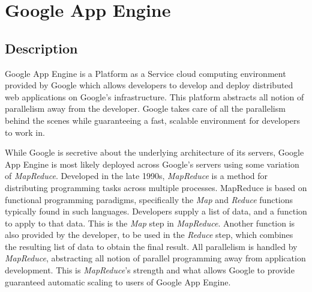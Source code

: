 \newcommand{\gae}[0]{Google App Engine}
\newcommand{\mr}[0]{\emph{MapReduce}}
\chapter{Google App Engine}

\section{Description}
\gae{} is a Platform as a Service cloud computing environment provided by Google which allows developers to develop and deploy distributed web applications on Google's infrastructure. This platform abstracts all notion of parallelism away from the developer. Google takes care of all the parallelism behind the scenes while guaranteeing a fast, scalable environment for developers to work in. 

While Google is secretive about the underlying architecture of its servers, \gae{} is most likely deployed across Google's servers using some variation of \mr{}. Developed in the late 1990s, \mr{} is a method for distributing programming tasks across multiple processes. MapReduce is based on functional programming paradigms, specifically the \emph{Map} and \emph{Reduce} functions typically found in such languages. Developers supply a list of data, and a function to apply to that data. This is the \emph{Map} step in \mr{}. Another function is also provided by the developer, to be used in the \emph{Reduce} step, which combines the resulting list of data to obtain the final result. All parallelism is handled by \mr{}, abstracting all notion of parallel programming away from application development. This is \mr{}'s strength and what allows Google to provide guaranteed automatic scaling to users of \gae{}.

%

